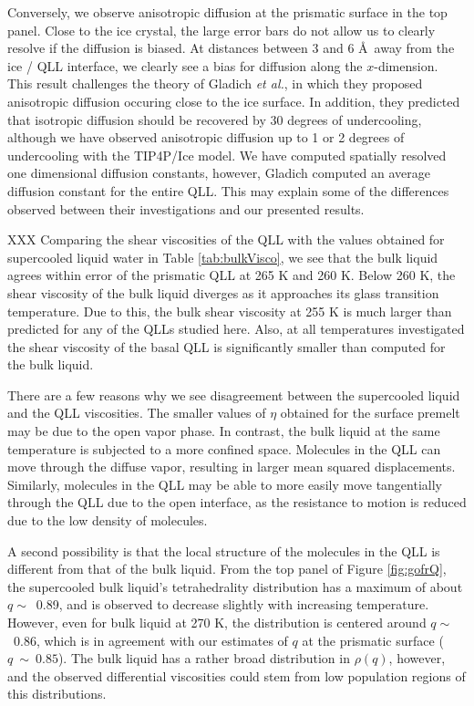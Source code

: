 Conversely, we observe anisotropic diffusion at the prismatic surface
in the top panel. Close to the ice crystal, the large error bars do
not allow us to clearly resolve if the diffusion is biased. At
distances between 3 and 6 \AA~away from the ice / QLL interface, we
clearly see a bias for diffusion along the $x$-dimension. This result
challenges the theory of Gladich \textit{et al.}, in which they
proposed anisotropic diffusion occuring close to the ice surface. In
addition, they predicted that isotropic diffusion should be recovered
by 30 degrees of undercooling, although we have observed anisotropic
diffusion up to 1 or 2 degrees of undercooling with the TIP4P/Ice
model. We have computed spatially resolved one dimensional diffusion
constants, however, Gladich computed an average diffusion constant for
the entire QLL. This may explain some of the differences observed
between their investigations and our presented results.

XXX
Comparing the shear viscosities of the QLL with the values obtained
for supercooled liquid water in Table \ref{tab:bulkVisco}, we see that
the bulk liquid agrees within error of the prismatic QLL at 265 K and
260 K. Below 260 K, the shear viscosity of the bulk liquid diverges as
it approaches its glass transition temperature. Due to this, the bulk
shear viscosity at 255 K is much larger than predicted for any of the
QLLs studied here. Also, at all temperatures investigated the shear
viscosity of the basal QLL is significantly smaller than computed for
the bulk liquid. 

There are a few reasons why we see disagreement between the
supercooled liquid and the QLL viscosities. The smaller values of
$\eta$ obtained for the surface premelt may be due to the open vapor
phase. In contrast, the bulk liquid at the same temperature is
subjected to a more confined space. Molecules in the QLL can move
through the diffuse vapor, resulting in larger mean squared
displacements. Similarly, molecules in the QLL may be able to more
easily move tangentially through the QLL due to the open interface, as
the resistance to motion is reduced due to the low density of
molecules.

A second possibility is that the local structure of the molecules
in the QLL is different from that of the bulk liquid. From the top
panel of Figure \ref{fig:gofrQ}, the supercooled bulk liquid's
tetrahedrality distribution has a maximum of about $q \sim$~0.89, and
is observed to decrease slightly with increasing temperature. However,
even for bulk liquid at 270 K, the distribution is centered around
$q \sim$~0.86, which is in agreement with our estimates of $q$ at the
prismatic surface ($q~\sim~0.85$). The bulk liquid has a rather broad
distribution in $\rho (q)$, however, and the observed differential
viscosities could stem from low population regions of this
distributions. 

